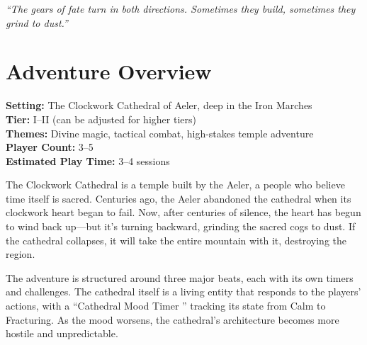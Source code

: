 \documentclass{article}
\begin{document}


\begin{center}
\textit{``The gears of fate turn in both directions. Sometimes they build, sometimes they grind to dust.''}
\end{center}

\begin{abstract}
The Clockwork Cathedral of Aeler, abandoned for centuries, has begun to activate its clockwork heart. But something is wrong---the gears turn backward, and the sacred cogs are grinding to dust. The Aeler people are desperate for help before the temple collapses and takes the entire mountain with it. This adventure is designed for Fate's Edge and specifically targets fans of D\&D 5e, preserving tactical combat while emphasizing narrative consequences. The cathedral is alive, its will responding to the players' actions through a ``Clock'' that tracks its mood from Calm to Fracturing. Players must navigate living architecture, repair sacred clockwork using Aeler ritual magic, and ultimately confront the corrupted heart of the cathedral before it shatters the mountain.
\end{abstract}


\section{Adventure Overview}

\begin{adventurebox}
\textbf{Setting:} The Clockwork Cathedral of Aeler, deep in the Iron Marches \\
\textbf{Tier:} I--II (can be adjusted for higher tiers) \\
\textbf{Themes:} Divine magic, tactical combat, high-stakes temple adventure \\
\textbf{Player Count:} 3--5 \\
\textbf{Estimated Play Time:} 3--4 sessions
\end{adventurebox}

The Clockwork Cathedral is a temple built by the Aeler, a people who believe time itself is sacred. Centuries ago, the Aeler abandoned the cathedral when its clockwork heart began to fail. Now, after centuries of silence, the heart has begun to wind back up---but it's turning backward, grinding the sacred cogs to dust. If the cathedral collapses, it will take the entire mountain with it, destroying the region.

The adventure is structured around three major beats, each with its own timers and challenges. The cathedral itself is a living entity that responds to the players' actions, with a ``Cathedral Mood Timer '' tracking its state from Calm to Fracturing. As the mood worsens, the cathedral's architecture becomes more hostile and unpredictable.
\end{document}
